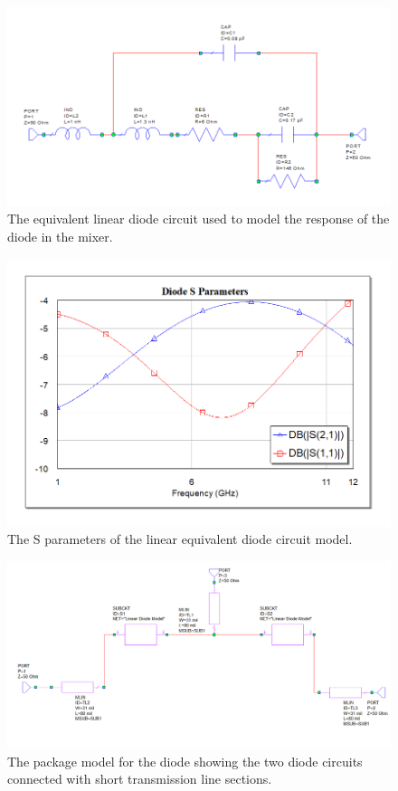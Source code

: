 \documentclass[twocolumn, aps, floatfix]{revtex4-1}
\begin{document}
\begin{figure}[!htbp]
    \includegraphics[scale=0.4]{diode_circuit.png}
    \caption{The equivalent linear diode circuit used to model the response of the diode in the mixer.}
    \label{fig:diodemodel}
\end{figure}

\begin{figure}[!htbp]
    \includegraphics[scale=0.4]{diode_Sparams.png}
    \caption{The S parameters of the linear equivalent diode circuit model.}
    \label{fig:diodeparams}
\end{figure}

\begin{figure}[!htbp]
    \includegraphics[scale=0.25]{diode_package_circuit.png}
    \caption{The package model for the diode showing the two diode circuits connected with short transmission line sections.}
    \label{fig:diodepackage}
\end{figure}
\end{document}
